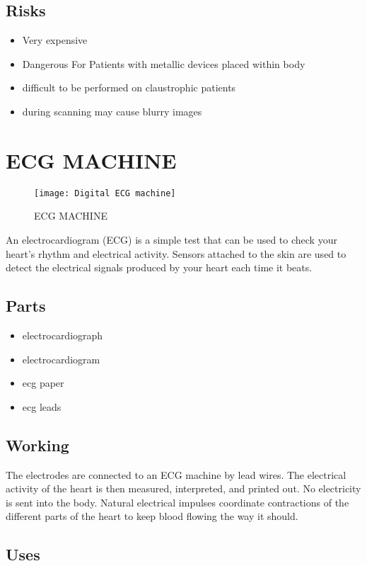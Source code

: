 \documentclass[12pt]{article}
\begin{document}
\subsection{Risks}
\begin{itemize}


\item Very expensive
\item Dangerous For Patients with metallic devices placed within body
\item  difficult to be performed on claustrophic patients
\item during scanning may cause blurry images

\end{itemize}

\section{ECG MACHINE}
\begin{figure}
\centering
\texttt{[image: Digital ECG machine]}
\caption{ECG MACHINE}
\end{figure}

An electrocardiogram (ECG) is a simple test that can be used to check your heart's rhythm and electrical activity. Sensors attached to the skin are used to detect the electrical signals produced by your heart each time it beats.

\subsection{Parts}
\begin{itemize}
\item electrocardiograph
\item electrocardiogram
\item ecg paper
\item ecg leads

\end{itemize}

\subsection{Working}
The electrodes are connected to an ECG machine by lead wires. The electrical activity of the heart is then measured, interpreted, and printed out. No electricity is sent into the body. Natural electrical impulses coordinate contractions of the different parts of the heart to keep blood flowing the way it should.

\subsection{Uses}
\end{document}
